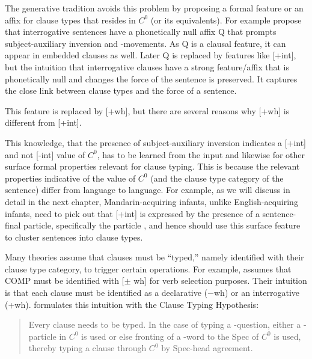 The generative tradition avoids this problem by proposing a formal feature or an affix for clause types that resides in $C^{0}$ (or its equivalents). For example \textcite{katzpostal1984} propose that interrogative sentences have a phonetically null affix Q that prompts subject-auxiliary inversion and \twh-movements. As Q is a clausal feature, it can appear in embedded clauses as well.  Later Q is replaced by features like [+int], but the intuition that interrogative clauses have a strong feature/affix that is phonetically null and changes the force of the sentence is preserved. It captures the close link between clause types and the force of a sentence.

This feature is replaced by [+wh], but there are several reasons why [+wh] is different from [+int]. 



This knowledge, that the presence of subject-auxiliary inversion indicates a [+int] and not [-int] value of $C^{0}$, has to be learned from the input and likewise for other surface formal properties relevant for clause typing. This is because the relevant properties indicative of the value of $C^{0}$ (and the clause type category of the sentence) differ from language to language. For example, as we will discuss in detail in the next chapter, Mandarin-acquiring infants, unlike English-acquiring infants, need to pick out that [+int] is expressed by the presence of a sentence-final particle, specifically the particle , and hence should use this surface feature to cluster sentences into clause types.



Many theories assume that clauses must be ``typed,'' namely identified with their clause type category, to trigger certain operations. For example, \textcite{chomskylasnik1977} assumes that COMP must be identified with [$\pm$ wh] for verb selection purposes. Their intuition is that each clause must be identified as a declarative ($-$wh) or an interrogative (+wh). \textcite{cheng1991} formulates this intuition with the Clause Typing Hypothesis:

\begin{quote}
Every clause needs to be typed. In the case of typing a \twh-question, either a \twh-particle in $C^{0}$ is used or else fronting of a \twh-word to the Spec of $C^{0}$ is used, thereby typing a clause through $C^{0}$ by Spec-head agreement. \hfill \textcite[p.9]{cheng1991}

\end{quote}


